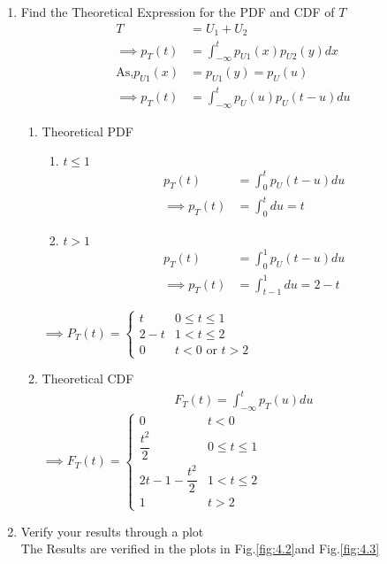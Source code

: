 \documentclass[journal,12pt,twocolumn]{IEEEtran}
\renewcommand\thesection{\arabic{section}}
\begin{document}
\begin{enumerate}[label=\thesection.\arabic*
,ref=\thesection.\theenumi]
\item Find the Theoretical Expression for the PDF and CDF of $T$\\
\solution
\begin{align}
    T&=U_1+U_2\\
    \implies p_T(t)&=\int_{-\infty}^{t}p_{U1}(x)p_{U2}(y)dx\\
    \text{As,}p_{U1}(x)&=p_{U1}(y)=p_{U}(u)\\
    \implies p_T(t)&=\int_{-\infty}^{t}p_{U}(u)p_{U}(t-u)du
    \end{align}
    \begin{enumerate}
        \item Theoretical PDF 
        \begin{enumerate}
            \item $t\le 1$
            \begin{align}
                p_T(t)&=\int_{0}^{t}p_{U}(t-u)du\\
                \implies p_T(t)&=\int_{0}^{t} du=t
            \end{align}
            \item $t> 1$
             \begin{align}
                p_T(t)&=\int_{0}^{1}p_{U}(t-u)du\\
                \implies p_T(t)&=\int_{t-1}^{1} du=2-t
            \end{align}
        \end{enumerate}
        $\implies\boxed{ P_T(t) =
        \begin{cases}
         t     &0 \le t \le 1 \\
         2-t   &1 < t \le 2\\
         0     &t<0 \text{ or }t>2
        \end{cases}
        }$\\
        \item Theoretical CDF 
        \begin{align}
            F_T(t)=\int_{-\infty}^{t}p_T(u)du
        \end{align}
        $\implies\boxed{
            F_{T}(t)=
            \begin{cases}
             0   &t<0\\
             \dfrac{t^2}{2} &0\le t \le 1\\
             2t-1-\dfrac{t^2}{2} &1<t \le 2\\
             1 &t>2
            \end{cases}
            }$\\
    \end{enumerate}
\item Verify your results through a plot \\
\solution The Results are verified in the plots in Fig.\ref{fig:4.2}and Fig.\ref{fig:4.3}
\end{enumerate}
\end{document}

